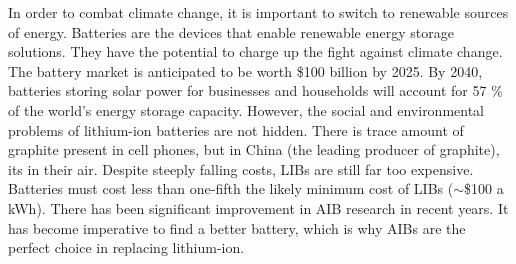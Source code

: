In order to combat climate change, it is important to switch to renewable sources of energy. Batteries are the devices that enable renewable energy storage solutions. They have the potential to charge up the fight against climate change. The battery market is anticipated to be worth \$100 billion by 2025. By 2040, batteries storing solar power for businesses and households will account for 57 \% of the world’s energy storage capacity. However, the social and environmental problems of lithium-ion batteries are not hidden. There is trace amount of graphite present in cell phones, but in China (the leading producer of graphite), its in their air. Despite steeply falling costs, LIBs are still far too expensive. Batteries must cost less than one-fifth the likely minimum cost of LIBs ($\sim$\$100 a kWh). There has been significant improvement in AIB research in recent years. It has become imperative to find a better battery, which is why AIBs are the perfect choice in replacing lithium-ion.